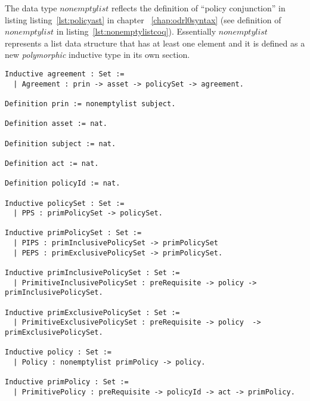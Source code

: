The data type $nonemptylist$ reflects the definition of ``policy conjunction'' in listing listing~\ref{lst:policyast} in chapter ~\ref{chap:odrl0syntax} (see definition of $nonemptylist$ in listing~\ref{lst:nonemptylistcoq}). Essentially $nonemptylist$ represents a list data structure that has at least one element and it is defined as a new \emph{polymorphic} inductive type in its own section. 

\lstset{language=Coq}
\begin{minipage}[c]{0.95\textwidth}
\begin{lstlisting}[frame=single, caption={ACCPL: Coq Version of Agreement},label={lst:agreementcoq}]
Inductive agreement : Set :=
  | Agreement : prin -> asset -> policySet -> agreement.

Definition prin := nonemptylist subject.

Definition asset := nat.

Definition subject := nat.

Definition act := nat.

Definition policyId := nat.

Inductive policySet : Set :=
  | PPS : primPolicySet -> policySet.
  
Inductive primPolicySet : Set :=
  | PIPS : primInclusivePolicySet -> primPolicySet
  | PEPS : primExclusivePolicySet -> primPolicySet.

Inductive primInclusivePolicySet : Set :=
  | PrimitiveInclusivePolicySet : preRequisite -> policy -> primInclusivePolicySet.

Inductive primExclusivePolicySet : Set :=
  | PrimitiveExclusivePolicySet : preRequisite -> policy  -> primExclusivePolicySet.

Inductive policy : Set :=
  | Policy : nonemptylist primPolicy -> policy.

Inductive primPolicy : Set :=
  | PrimitivePolicy : preRequisite -> policyId -> act -> primPolicy.

\end{lstlisting}
\end{minipage}

